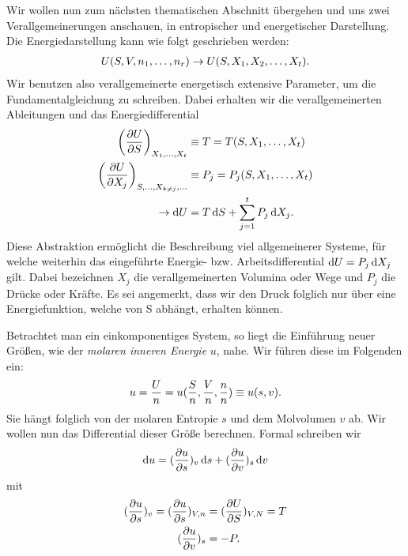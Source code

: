 Wir wollen nun zum nächsten thematischen Abschnitt übergehen und uns zwei Verallgemeinerungen anschauen, in entropischer und energetischer Darstellung.
Die Energiedarstellung kann wie folgt geschrieben werden:
\begin{align*}
    U(S,V,n_1,\ldots,n_r) \rightarrow U(S,X_1,X_2,\ldots,X_t).
\end{align*}
Wir benutzen also verallgemeinerte energetisch extensive Parameter, um die Fundamentalgleichung zu schreiben. Dabei erhalten wir die verallgemeinerten Ableitungen und das Energiedifferential
\begin{align}
    \left(\frac{\partial U}{\partial S}\right)_{X_1,\ldots,X_t}                & \equiv T = T(S,X_1,\ldots,X_t)           \nonumber  \\
    \left(\frac{\partial U}{\partial X_j}\right)_{S,\ldots,X_{k\neq j},\ldots} & \equiv P_j = P_j(S,X_1,\ldots,X_t)        \nonumber \\
    \label{eq:energetische_fundamentalgleichung}
    \rightarrow \mathop{}\!\mathrm{d} U                                                        & = T\mathop{}\!\mathrm{d} S + \sum_{j=1}^tP_j\mathop{}\!\mathrm{d} X_j.
\end{align}
Diese Abstraktion ermöglicht die Beschreibung viel allgemeinerer Systeme, für welche weiterhin das eingeführte Energie- bzw. Arbeitsdifferential $\mathop{}\!\mathrm{d} U = P_j\mathop{}\!\mathrm{d} X_j$ gilt.
Dabei bezeichnen $X_j$ die verallgemeinerten Volumina oder Wege und $P_j$ die Drücke oder Kräfte.
Es sei angemerkt, dass wir den Druck folglich nur über eine Energiefunktion, welche von S abhängt, erhalten können.

Betrachtet man ein einkomponentiges System, so liegt die Einführung neuer Größen, wie der \emph{molaren inneren Energie} $u$, nahe. Wir führen diese im Folgenden ein:
\begin{align*}
    u=\frac{U}{n}=u(\frac{S}{n},\frac{V}{n},\frac{n}{n})\equiv u(s,v).
\end{align*}
Sie hängt folglich von der molaren Entropie $s$ und dem Molvolumen $v$ ab.
Wir wollen nun das Differential dieser Größe berechnen. Formal schreiben wir
\begin{align*}
    \mathop{}\!\mathrm{d} u = (\frac{\partial u}{\partial s})_v \mathop{}\!\mathrm{d} s + (\frac{\partial u}{\partial v})_s\mathop{}\!\mathrm{d} v
\end{align*}
mit
\begin{align*}
    (\frac{\partial u}{\partial s})_v=(\frac{\partial u}{\partial s})_{V,n}&=(\frac{\partial U}{\partial S})_{V,N} =T    \\
    (\frac{\partial u}{\partial v})_s                                                                             & = -P.
\end{align*}

